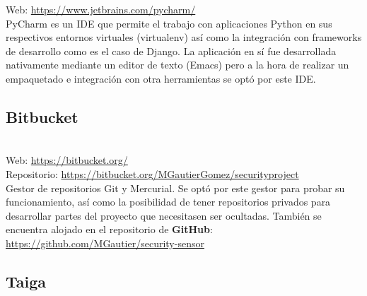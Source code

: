 Web: \url{https://www.jetbrains.com/pycharm/}\\

PyCharm es un IDE que permite el trabajo con aplicaciones Python en sus respectivos entornos virtuales (virtualenv) así como la integración con frameworks de desarrollo como es el caso de Django. La aplicación en sí fue desarrollada nativamente mediante un editor de texto (Emacs) pero a la hora de realizar un empaquetado e integración con otra herramientas se optó por este IDE. \\

\subsection{Bitbucket}

\\

Web: \url{https://bitbucket.org/}\\
Repositorio: \url{https://bitbucket.org/MGautierGomez/securityproject}\\

Gestor de repositorios Git y Mercurial. Se optó por este gestor para probar su funcionamiento, así como la posibilidad de tener repositorios privados para desarrollar partes del proyecto que necesitasen ser ocultadas. También se encuentra alojado en el repositorio de \textbf{GitHub}: \url{https://github.com/MGautier/security-sensor}\\

\subsection{Taiga}


